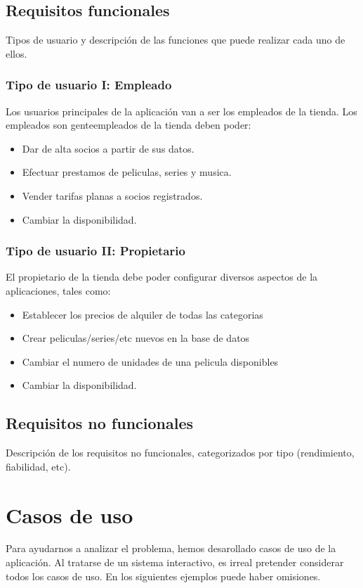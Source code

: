 \documentclass[11pt,a4paper]{article}
\begin{document}
\subsection{Requisitos funcionales}
Tipos de usuario y descripción de las funciones que puede realizar cada uno de ellos.

\subsubsection{Tipo de usuario I: Empleado}
Los usuarios principales de la aplicación van a ser los empleados de la tienda. Los empleados son genteempleados de la tienda deben poder:
\begin{itemize}
	\item Dar de alta socios a partir de sus datos.
	\item Efectuar prestamos de peliculas, series y musica.
	\item Vender tarifas planas a socios registrados.
	\item Cambiar la disponibilidad.
\end{itemize}

\subsubsection{Tipo de usuario II: Propietario}
El propietario de la tienda debe poder configurar diversos aspectos de la aplicaciones, tales como:
\begin{itemize}
	\item Establecer los precios de alquiler de todas las categorias
	\item Crear peliculas/series/etc nuevos en la base de datos
	\item Cambiar el numero de unidades de una pelicula disponibles
	\item Cambiar la disponibilidad.
\end{itemize}

\subsection{Requisitos no funcionales}
Descripción de los requisitos no funcionales, categorizados por tipo (rendimiento, fiabilidad, etc).

\section{Casos de uso}
Para ayudarnos a analizar el problema, hemos desarollado casos de uso de la aplicación.
Al tratarse de un sistema interactivo, es irreal pretender considerar todos los casos de uso.
En los siguientes ejemplos puede haber omisiones.
\end{document}
